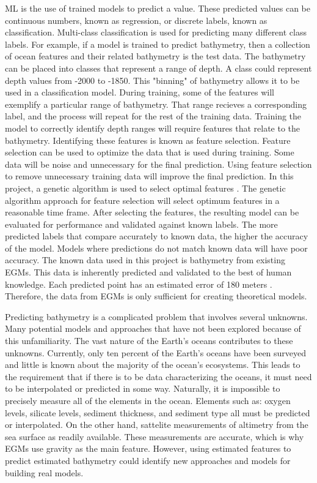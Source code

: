 \par
\ac{ML} is the use of trained models to predict a value.
These predicted values can be continuous numbers, known as regression, or discrete labels, known as classification.
Multi-class classification is used for predicting many different class labels.
For example, if a model is trained to predict bathymetry, then a collection of ocean features and their related bathymetry is the test data.
The bathymetry can be placed into classes that represent a range of depth.
A class could represent depth values from -2000 to -1850.
This "binning" of bathymetry allows it to be used in a classification model.
During training, some of the features will exemplify a particular range of bathymetry.
That range recieves a corresponding label, and the process will repeat for the rest of the training data.
Training the model to correctly identify depth ranges will require features that relate to the bathymetry.
Identifying these features is known as feature selection.
Feature selection can be used to optimize the data that is used during training.
Some data will be noise and unnecessary for the final prediction.
Using feature selection to remove unnecessary training data will improve the final prediction.
In this project, a genetic algorithm is used to select optimal features \cite{yang1998feature}.
The genetic algorithm approach for feature selection will select optimum features in a reasonable time frame.
After selecting the features, the resulting model can be evaluated for performance and validated against known labels.
The more predicted labels that compare accurately to known data, the higher the accuracy of the model.
Models where predictions do not match known data will have poor accuracy.
The known data used in this project is bathymetry from existing \ac{EGM}s.
This data is inherently predicted and validated to the best of human knowledge.
Each predicted point has an estimated error of 180 meters \cite{becker2009global}. 
Therefore, the data from \ac{EGM}s is only sufficient for creating theoretical models.

\par
Predicting bathymetry is a complicated problem that involves several unknowns.
Many potential models and approaches that have not been explored because of this unfamiliarity.
The vast nature of the Earth's oceans contributes to these unknowns.
Currently, only ten percent of the Earth's oceans have been surveyed and little is known about the majority of the ocean's ecosystems.
This leads to the requirement that if there is to be data characterizing the oceans, it must need to be interpolated or predicted in some way.
Naturally, it is impossible to precisely measure all of the elements in the ocean.
Elements such as: oxygen levels, silicate levels, sediment thickness, and sediment type all must be predicted or interpolated.
On the other hand, sattelite measurements of altimetry from the sea surface as readily available.
These measurements are accurate, which is why \ac{EGM}s use gravity as the main feature.
However, using estimated features to predict estimated bathymetry could identify new approaches and models for building real models.

